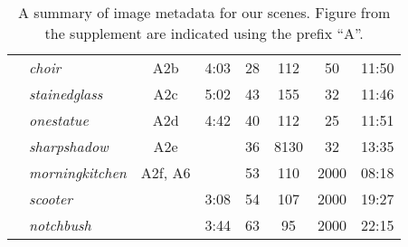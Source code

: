 \begin{table*}[]
\begin{tabular}{r|l|cccccc}
 & \textit{choir}            &  A2b      &  4:03     &   28  &                   112  &     50  &  11:50   \\
 & \textit{stainedglass}     &  A2c      &  5:02     &   43  &                   155  &     32  &  11:46   \\
 & \textit{onestatue}        &  A2d      &  4:42     &   40  &                   112  &     25  &  11:51   \\
 & \textit{sharpshadow}      &  A2e      &       &   36  &                  8130  &     32  &  13:35   \\
 & \textit{morningkitchen}   &  A2f, A6  &       &   53  &                   110  &   2000  &  08:18   \\
 & \textit{scooter}          &           &  3:08     &   54  &                   107  &   2000  &  19:27   \\
 & \textit{notchbush}        &           &  3:44     &   63  &                    95  &   2000  &  22:15   
    \end{tabular}
    \caption{A summary of image metadata for our scenes. Figure from the supplement are indicated using the prefix ``A''.}
    \label{tab:sceneindex}
\end{table*}
